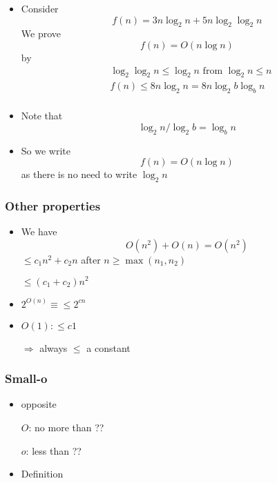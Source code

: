 \begin{frame}[allowframebreaks]
  \begin{itemize}
  \item Consider
    \begin{equation*}
    f(n)=3n \log_2 n + 5n \log_2 \log_2 n
  \end{equation*}
We prove
\begin{equation*}
f(n) = O(n\log n)
\end{equation*}
by 
\begin{equation*}
  \begin{split}
& \log_2 \log_2 n \leq \log_2 n \text{ from } \log_2 n \leq n \\
& f(n) \leq 8n \log_2 n = 8n\log_2 b\log_b n \\
\end{split}
\end{equation*}

\item Note that
  \begin{equation*}
 \log_2 n / \log_2 b= \log_b n
\end{equation*}
\item So we write
  \begin{equation*}
  f(n)=O(n\log n)
\end{equation*}
as there is no need to write $\log_2 n$
\end{itemize}\end{frame} \begin{frame}[allowframebreaks] \frametitle{Other properties}
  \begin{itemize}
  \item We have
    \begin{equation*}
    O(n^2) + O(n) = O(n^2)
  \end{equation*}
$\leq c_1 n^2 + c_2 n $ after $n \geq \max(n_1,n_2)$

$\leq (c_1+c_2) n^2$
\item $2^{O(n)} \equiv \leq 2^{cn}$
\item $O(1): \leq c 1$

$\Rightarrow$ always $\leq$ a constant
\end{itemize}\end{frame} \begin{frame}[allowframebreaks] \frametitle{Small-o}
  \begin{itemize}
\item opposite

$O$: no more than ??

$o$: less than ??
\item Definition 


\end{itemize}
\end{frame}
